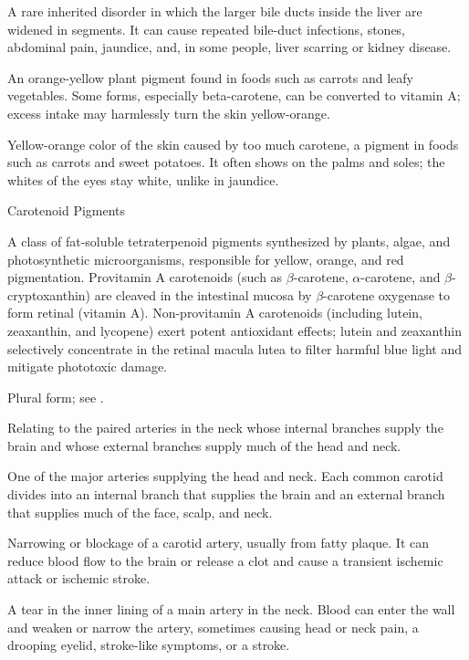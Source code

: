  A rare inherited disorder in which the larger bile ducts inside the liver are widened in segments. It can cause repeated bile-duct infections, stones, abdominal pain, jaundice, and, in some people, liver scarring or kidney disease.

 An orange-yellow plant pigment found in foods such as carrots and leafy vegetables. Some forms, especially beta-carotene, can be converted to vitamin A; excess intake may harmlessly turn the skin yellow-orange.

 Yellow-orange color of the skin caused by too much carotene, a pigment in foods such as carrots and sweet potatoes. It often shows on the palms and soles; the whites of the eyes stay white, unlike in jaundice.

\synonyms
Carotenoid Pigments

 A class of fat-soluble tetraterpenoid pigments synthesized by plants, algae, and photosynthetic microorganisms, responsible for yellow, orange, and red pigmentation. Provitamin A carotenoids (such as $\beta$-carotene, $\alpha$-carotene, and $\beta$-cryptoxanthin) are cleaved in the intestinal mucosa by $\beta$-carotene oxygenase to form retinal (vitamin A). Non-provitamin A carotenoids (including lutein, zeaxanthin, and lycopene) exert potent antioxidant effects; lutein and zeaxanthin selectively concentrate in the retinal macula lutea to filter harmful blue light and mitigate phototoxic damage.

 Plural form; see .

 Relating to the paired arteries in the neck whose internal branches supply the brain and whose external branches supply much of the head and neck.

 One of the major arteries supplying the head and neck. Each common carotid divides into an internal branch that supplies the brain and an external branch that supplies much of the face, scalp, and neck.

 Narrowing or blockage of a carotid artery, usually from fatty plaque. It can reduce blood flow to the brain or release a clot and cause a transient ischemic attack or ischemic stroke.

 A tear in the inner lining of a main artery in the neck. Blood can enter the wall and weaken or narrow the artery, sometimes causing head or neck pain, a drooping eyelid, stroke-like symptoms, or a stroke.

